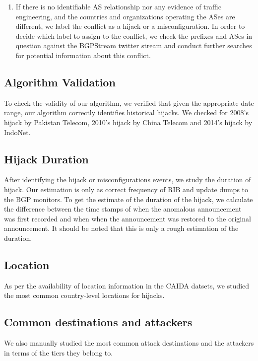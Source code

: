 \begin{enumerate}
\item If there is no identifiable AS relationship nor any evidence of traffic engineering, and the countries and organizations operating the ASes are different, we label the conflict as a hijack or a misconfiguration. In order to decide which label to assign to the conflict, we check the prefixes and ASes in question against the BGPStream twitter stream and conduct further searches for potential information about this conflict.
\end{enumerate}
\subsection{Algorithm Validation}
To check the validity of our algorithm, we verified that given the appropriate date range, our algorithm correctly identifies historical hijacks. We checked for 2008's hijack by Pakistan Telecom, 2010's hijack by China Telecom and 2014's hijack by IndoNet. 
\subsection{Hijack Duration}
After identifying the hijack or misconfigurations events, we study the duration of hijack. Our estimation is only as correct frequency of RIB and update dumps to the BGP monitors. To get the estimate of the duration of the hijack, we calculate the difference between the time stamps of when the anomalous announcement was first recorded and when when the announcement was restored to the original announcement. It should be noted that this is only a rough estimation of the duration. 
\subsection{Location}
As per the availability of location information in the CAIDA datsets, we studied the most common country-level locations for hijacks. 
\subsection{Common destinations and attackers}
We also manually studied the most common attack destinations and the attackers in terms of the tiers they belong to. 